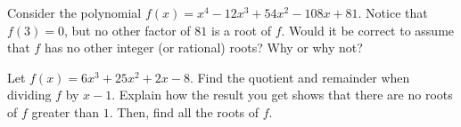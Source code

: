 \begin{exercise}
    Consider the polynomial $f(x) = x^4 - 12x^3 + 54x^2 - 108x + 81$. Notice that $f(3) = 0$, but no other factor of $81$ is a root of $f$. Would it be correct to assume that $f$ has no other integer (or rational) roots? Why or why not?
\end{exercise}

\begin{exercise}
    Let $f(x) = 6x^3+25x^2+2x-8$. Find the quotient and remainder when dividing $f$ by $x-1$. Explain how the result you get shows that there are no roots of $f$ greater than $1$. Then, find all the roots of $f$.
\end{exercise}